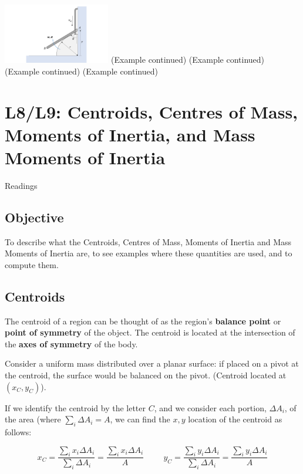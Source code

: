 \documentclass[12pt,letterpaper,twoside]{report}
\begin{document}
\includegraphics[trim={11cm 0cm 7cm 0cm},clip,width=0.35\textwidth, left]{Slide34} 
\newpage
(Example continued)
\newpage
(Example continued)
\newpage
(Example continued)
\newpage
(Example continued)

\chapter{L8/L9: Centroids, Centres of Mass, Moments of Inertia, and Mass Moments of Inertia}
Readings

\section{Objective}
To describe what the Centroids, Centres of Mass, Moments of Inertia and Mass Moments of Inertia are, to see examples where these quantities are used, and to compute them.  

\section{Centroids}
The centroid of a region can be thought of as the region’s \textbf{balance point} or \textbf{point of symmetry} of the object.  The centroid is located at the intersection of the \textbf{axes of symmetry} of the body.  

\newpage

Consider a uniform mass distributed over a planar surface: if placed on a pivot at the centroid, the surface would be balanced on the pivot. (Centroid located at $(x_C, y_C)$).

\vspace*{10\baselineskip}
If we identify the centroid by the letter $C$, and we consider each portion, $\Delta A_i$, of the area (where $\displaystyle \sum_{i} \Delta A_i = A$, we can find the $x,y$ location of the centroid as follows:

\[
x_C = \frac{\displaystyle \sum_{i} x_i \Delta A_i}{\displaystyle \sum_{i} \Delta A_i} = \frac{\displaystyle \sum_{i} x_i \Delta A_i}{A} \hspace{1cm} y_C = \frac{\displaystyle \sum_{i} y_i \Delta A_i}{\displaystyle \sum_{i} \Delta A_i} = \frac{\displaystyle \sum_{i} y_i \Delta A_i}{A} 
\]
\end{document}

